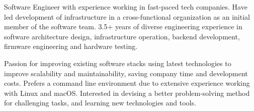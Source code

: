 

\begin{cvparagraph}

Software Engineer with experience working in fast-paced tech companies. Have led development of infrastructure in a cross-functional organization as an initial member of the software team. 3.5+ years of diverse engineering experience in software architecture design, infrastructure operation, backend development, firmware engineering and hardware testing.

Passion for improving existing software stacks using latest technologies to improve scalability and maintainability, saving company time and development costs. Prefers a command line environment due to extensive experience working with Linux and macOS. Interested in devising a better problem-solving method for challenging tasks, and learning new technologies and tools.
\end{cvparagraph}
